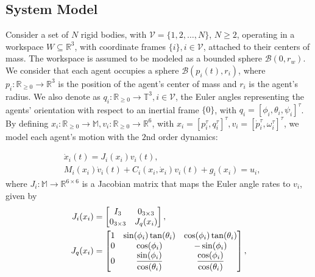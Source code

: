 \subsection{System Model}
Consider a set of $N$ rigid bodies, with $\mathcal{V} = \{ 1,2, \ldots, N\}$,
$N  \geq 2$, operating in a workspace $W\subseteq \mathbb{R}^3$, with coordinate
frames $\{i\}, i\in\mathcal{V}$, attached to their centers of mass. The
workspace is assumed to be modeled as a bounded sphere $\mathcal{B}(0,r_w)$.
We consider that each agent occupies a sphere $\mathcal{B}(p_i(t), r_i)$,
where $p_i:\mathbb{R}_{\geq 0} \to \mathbb{R}^3$ is the position of the agent's
center of mass and $r_i$ is the agent's radius. We also denote as
$q_i:\mathbb{R}_{\geq 0} \to \mathbb{T}^3, i\in\mathcal{V}$, the Euler angles
representing the agents' orientation with respect to an inertial frame $\{0\}$,
with $q_i = [\phi_i,\theta_i,\psi_i]^\tau$.
By defining $x_i:\mathbb{R}_{\geq 0} \to \mathbb{M}, v_i : \mathbb{R}_{\geq 0} \to \mathbb{R}^6$,
with $x_i = [p^\tau_i,q^\tau_i]^\tau, v_i =[\dot{p}^\tau_i,\omega^\tau_i]^\tau$,
we model each agent's motion with the $2$nd order dynamics:

\begin{subequations}\label{eq:system}
	\begin{align}
	& \dot{x}_i(t) = J_i(x_i)v_i(t) , \label{eq:system_1} \\
	& M_i(x_i) \dot{v}_i(t) + C_i(x_i,\dot{x}_i) v_i(t)+g_i(x_i) = u_i,  \label{eq:system_2}
	\end{align}
\end{subequations}
where $J_i:\mathbb{M} \to \mathbb{R}^{6\times6}$ is a Jacobian matrix that maps
the Euler angle rates to $v_i$, given by
\begin{align}
J_i(x_i)
&=
\begin{bmatrix}
I_3 & 0_{3 \times 3} \\
0_{3 \times 3} & J_{ q }(x_i) \\
\end{bmatrix} \notag, \\
J_q(x_i)
&=
\begin{bmatrix}
1 & \sin(\phi_i) \tan(\theta_i)  & \cos(\phi_i) \tan(\theta_i) \\
0 & \cos(\phi_i) & -\sin(\phi_i) \\
0  & \displaystyle \frac{\sin(\phi_i)}{\cos(\theta_i)} & \displaystyle \frac{\cos(\phi_i)}{\cos(\theta_i)}
\end{bmatrix}, \notag
\end{align}

